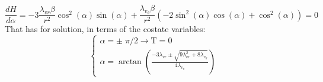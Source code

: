 \documentclass{report}
\begin{document}
\begin{equation*}
\frac{dH}{d\alpha }= -3\frac{\lambda_{vr} \beta}{r^2}\cos^2(\alpha)\sin(\alpha) + \frac{\lambda_{v_{\theta}}\beta}{r^2}(-2\sin^2(\alpha)\cos(\alpha) + \cos^2(\alpha))  = 0 
\end{equation*}
That has for solution, in terms of the costate variables:
\begin{equation*}
    \begin{cases}
        \alpha = \pm \;\pi/2 \rightarrow \textrm{T} = 0\\
        \alpha = \arctan(\frac{-3\lambda_{vr} \pm \sqrt{9\lambda_{vr}^2 + 8\lambda_{v_{\theta}}}}{4\lambda_{v_{\theta}}}) 
    \end{cases}
\end{equation*}


\end{document}
